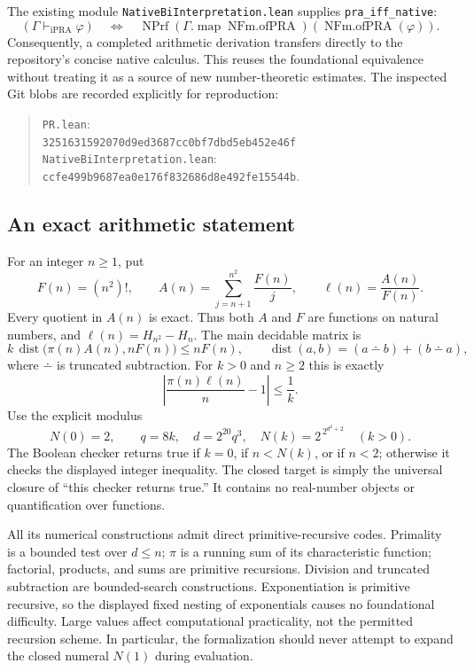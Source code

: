 The existing module \texttt{NativeBiInterpretation.lean} supplies
\texttt{pra\_iff\_native}:
\[
 (\Gamma\vdash_{\mathrm{iPRA}}\varphi)
 \quad\Longleftrightarrow\quad
 \operatorname{NPrf}
   (\Gamma.\operatorname{map}\operatorname{NFm.ofPRA})
   (\operatorname{NFm.ofPRA}(\varphi)).
\]
Consequently, a completed arithmetic derivation transfers directly to the
repository's concise native calculus.  This reuses the foundational
equivalence without treating it as a source of new number-theoretic
estimates. The inspected Git blobs are recorded explicitly for reproduction:
\begin{quote}\small
\texttt{PR.lean}:\\
\texttt{3251631592070d9ed3687cc0bf7dbd5eb452e46f}\\[3pt]
\texttt{NativeBiInterpretation.lean}:\\
\texttt{ccfe499b9687ea0e176f832686d8e492fe15544b}.
\end{quote}

\subsection{An exact arithmetic statement}

For an integer $n\geq 1$, put
\[
 F(n)=(n^2)!,\qquad
 A(n)=\sum_{j=n+1}^{n^2}\frac{F(n)}{j},\qquad
 \ell(n)=\frac{A(n)}{F(n)}.
\]
Every quotient in $A(n)$ is exact.  Thus both $A$ and $F$ are functions on
natural numbers, and $\ell(n)=H_{n^2}-H_n$.  The main decidable matrix is
\[
 k\,\operatorname{dist}\bigl(\pi(n)A(n),nF(n)\bigr)\leq nF(n),
 \qquad
 \operatorname{dist}(a,b)=(a\mathbin{\dotminus}b)+(b\mathbin{\dotminus}a),
\]
where $\dotminus$ is truncated subtraction.  For $k>0$ and $n\geq 2$ this is
exactly
\[
 \left|\frac{\pi(n)\ell(n)}n-1\right|\leq\frac1k.
\]
Use the explicit modulus
\[
 N(0)=2,\qquad
 q=8k,\quad d=2^{20}q^3,\quad
 N(k)=2^{\,2^{d^2+2}}\quad(k>0).
\]
The Boolean checker returns true if $k=0$, if $n<N(k)$, or if $n<2$;
otherwise it checks the displayed integer inequality.  The closed target
is simply the universal closure of ``this checker returns true.''  It
contains no real-number objects or quantification over functions.

All its numerical constructions admit direct primitive-recursive codes.
Primality is a bounded test over $d\leq n$; $\pi$ is a running sum of its
characteristic function; factorial, products, and sums are primitive
recursions.  Division and truncated subtraction are bounded-search
constructions.  Exponentiation is primitive recursive, so the displayed
fixed nesting of exponentials causes no foundational difficulty.  Large
values affect computational practicality, not the permitted recursion
scheme.  In particular, the formalization should never attempt to expand
the closed numeral $N(1)$ during evaluation.

